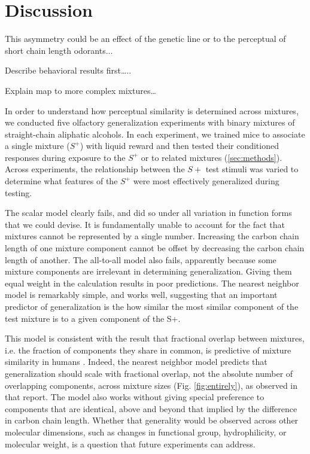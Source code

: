 \section*{Discussion}
\label{sec:discussion}

This asymmetry could be an effect of the genetic line or to the perceptual of short chain length odorants...

Describe behavioral results first…..

Explain map to more complex mixtures…

In order to understand how perceptual similarity is determined across mixtures, we conducted five olfactory generalization experiments with binary mixtures of straight-chain aliphatic alcohols.  
In each experiment, we trained mice to associate a single mixture ($S^+$) with liquid reward and then tested their conditioned responses during exposure to the $S^+$ or to related mixtures (\ref{sec:methods}).  
Across experiments, the relationship between the $S+$ test stimuli was varied to determine what features of the $S^+$ were most effectively generalized during testing.  

The scalar model clearly fails, and did so under all variation in function forms that we could devise.  It is fundamentally unable to account for the fact that mixtures cannot be represented by a single number.  Increasing the carbon chain length of one mixture component cannot be offset by decreasing the carbon chain length of another.  The all-to-all model also fails, apparently because some mixture components are irrelevant in determining generalization.  Giving them equal weight in the calculation results in poor predictions.  The nearest neighbor model is remarkably simple, and works well, suggesting that an important predictor of generalization is the how similar the most similar component of the test mixture is to a given component of the S+.  

This model is consistent with the result that fractional overlap between mixtures, i.e. the fraction of components they share in common, is predictive of mixture similarity in humans \cite{24653035}.  Indeed, the nearest neighbor model predicts that generalization should scale with fractional overlap, not the absolute number of overlapping components, across mixture sizes (Fig. \ref{fig:entirely}), as observed in that report.  The model also works without giving special preference to components that are identical, above and beyond that implied by the difference in carbon chain length.  Whether that generality would be observed across other molecular dimensions, such as changes in functional group, hydrophilicity, or molecular weight, is a question that future experiments can address.  

